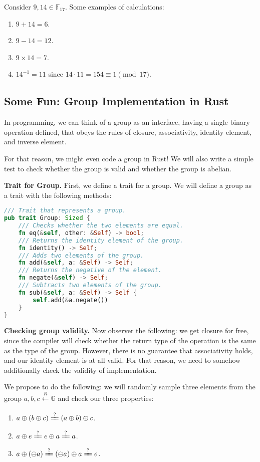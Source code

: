 \documentclass[../lecture-notes-148x210.tex]{subfiles}
\begin{document}
\begin{example}
    Consider $9, 14 \in \mathbb{F}_{17}$. Some examples of calculations:
    \begin{enumerate}
        \item $9+14 = 6$.
        \item $9-14 = 12$.
        \item $9 \times 14 = 7$.
        \item $14^{-1} = 11$ since $14 \cdot 11 = 154 \equiv 1 \pmod{17}$.
    \end{enumerate}
\end{example}

\subsection{Some Fun: Group Implementation in Rust}

In programming, we can think of a group as an interface, having a single binary operation defined, that obeys the 
rules of closure, associativity, identity element, and inverse element.

For that reason, we might even code a group in Rust! We will also write a simple test to check whether the group is 
valid and whether the group is abelian.

\textbf{Trait for Group.} First, we define a trait for a group. We will define a group as a trait with the following methods:
\begin{lstlisting}[language=Rust]
/// Trait that represents a group.
pub trait Group: Sized {
    /// Checks whether the two elements are equal.
    fn eq(&self, other: &Self) -> bool;
    /// Returns the identity element of the group.
    fn identity() -> Self;
    /// Adds two elements of the group.
    fn add(&self, a: &Self) -> Self;
    /// Returns the negative of the element.
    fn negate(&self) -> Self;
    /// Subtracts two elements of the group.
    fn sub(&self, a: &Self) -> Self {
        self.add(&a.negate())
    }
}
\end{lstlisting}

\textbf{Checking group validity.} Now observer the following: we get closure for free, since the compiler will check 
whether the return type of the operation is the same as the type of the group. However, there is no guarantee that 
associativity holds, and our identity element is at all valid. For that reason, we need to somehow additionally check 
the validity of implementation.

We propose to do the following: we will randomly sample three elements from the group 
$a,b,c \xleftarrow[]{R} \mathbb{G}$ and check our three properties:
\begin{enumerate}
    \item $a \oplus (b \oplus c) \xlongequal{?} (a \oplus b) \oplus c$.
    \item $a \oplus e \xlongequal{?} e \oplus a \xlongequal{?} a $.
    \item $a \oplus (\ominus a) \xlongequal{?} (\ominus a) \oplus a \xlongequal{?} e$.
\end{enumerate}
\end{document}

